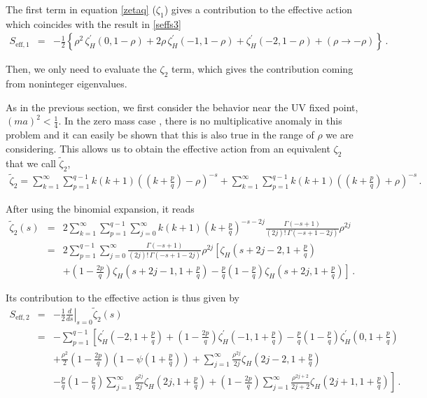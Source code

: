 \documentclass[12pt,a4paper]{article}
\newcommand{\beq}{\begin{eqnarray}}
\newcommand{\eeq}{\end{eqnarray}}
\newcommand{\nn}{\nonumber}
\numberwithin{equation}{section}
\begin{document}
The first term in equation \eqref{zetaq} ($\zeta_1$) gives a contribution to the effective action which coincides with the result in \eqref{seffs3}
\beq
S_{\mathrm{eff},1}&=&-\frac12 \left\{ {\rho}^{2} \,\zeta^{\prime}_H (0, 1-\rho)  +
2 {\rho} \,\zeta^{\prime}_H (-1, 1-\rho) + \zeta^{\prime}_H (-2, 1-\rho) + (\rho\rightarrow -\rho)\right\}\,.
\label{seff1}\eeq


Then, we only need to evaluate the $\zeta_2$ term, which gives the contribution coming from noninteger eigenvalues.

As in the previous section, we first consider the behavior near the UV fixed point, $(ma)^2< \frac{1}{4}$. In the zero mass case \cite{dowkerentang}, there is no multiplicative anomaly in this problem and it can easily be shown that this is also true in the range of $\rho$ we are considering. This allows us to obtain the effective action from an equivalent $\zeta_2$ that we call $\tilde\zeta_2$,
\beq
\tilde{\zeta}_2= \sum_{k=1}^{\infty}\sum_{p=1}^{q-1} k(k+1) \left(\left(k + \frac{p}{q}\right) - \rho \right)^{-s} +
\sum_{k=1}^{\infty}\sum_{p=1}^{q-1} k(k+1) \left(\left(k + \frac{p}{q}\right) + \rho \right)^{-s}\,.
\eeq

After using the binomial expansion, it reads
\beq
\tilde{\zeta}_2(s) &=& 2 \sum_{k=1}^{\infty}\sum_{p=1}^{q-1}\sum_{j=0}^{\infty} k(k+1) \left(k + \frac{p}{q}\right)^{-s-2j} \frac{\Gamma(-s+1)}{(2j)!\,\Gamma(-s+1-2j)} {\rho}^{2j}\nn\\
&=&  2 \sum_{p=1}^{q-1}\sum_{j=0}^{\infty}  \frac{\Gamma(-s+1)}{(2j)!\,\Gamma(-s+1-2j)} {\rho}^{2j} \left[ \zeta_H (s+2j-2, 1+\frac{p}{q})\right.\nn \\
&&+ \left.  \left( 1-\frac{2p}{q}\right)
\zeta_H (s+2j-1, 1+\frac{p}{q}) - \frac{p}{q}\left( 1-\frac{p}{q}\right)\zeta_H (s+2j, 1+\frac{p}{q}) \right]\,.
\eeq

Its contribution to the effective action is thus given by
\beq
S_{\mathrm{eff},2} &=&-\frac12 \left.\frac{d}{ds} \right\vert_{s=0} \tilde{\zeta}_2(s) \nn \\
&=& - \sum_{p=1}^{q-1} \left[ \zeta^{\prime}_H (-2, 1+\frac{p}{q}) + \left( 1-\frac{2p}{q}\right)
\zeta^{\prime}_H (-1, 1+\frac{p}{q}) - \frac{p}{q}\left( 1-\frac{p}{q}\right)\zeta^{\prime}_H (0, 1+\frac{p}{q})\right. \nn \\
&&+ \frac{{\rho}^2}{2} \left( 1-\frac{2p}{q}\right) \left(1-\psi(1 + \frac{p}{q})\right) + \sum_{j=1}^{\infty} \frac{{\rho}^{2j}}{2j} \zeta_H (2j-2, 1+\frac{p}{q}) \\
&&-\left. \frac{p}{q}\left( 1-\frac{p}{q}\right) \sum_{j=1}^{\infty} \frac{{\rho}^{2j}}{2j} \zeta_H (2j, 1+\frac{p}{q}) +
\left( 1-\frac{2p}{q}\right) \sum_{j=1}^{\infty} \frac{{\rho}^{2j+2}}{2j+2} \zeta_H (2j+1, 1+\frac{p}{q}) \right]\,.\nn
\eeq
\end{document}
